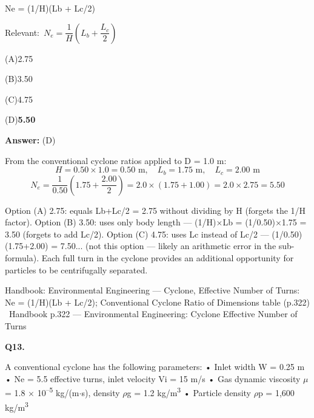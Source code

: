 \documentclass[11pt]{article}
\newcommand{\correct}[1]{\textbf{#1}\;{\color{accent}$\checkmark$}}
\newcommand{\optline}[2]{\par\noindent\hspace{1.2em}(#1)\hspace{0.6em}#2}
\begin{document}
Ne = (1/H)(Lb + Lc/2)\par\vspace{3pt}
{\small\color{soft}Relevant:}\ $N_e = \dfrac{1}{H}\left(L_b + \dfrac{L_c}{2}\right)$\par\vspace{3pt}
\optline{A}{2.75}
\optline{B}{3.50}
\optline{C}{4.75}
\optline{D}{\correct{5.50}}
\par\vspace{3pt}
\vspace{2pt}\par\noindent\colorbox{boxbg}{\parbox{\dimexpr\linewidth-2\fboxsep\relax}{%
\vspace{2pt}\textbf{Answer:} (D)\par\vspace{2pt}
{\small From the conventional cyclone ratios applied to D = 1.0 m:
\[H = 0.50\times1.0 = 0.50\text{ m},\quad L_b = 1.75\text{ m},\quad L_c = 2.00\text{ m}\]
\[N_e = \frac{1}{0.50}\left(1.75 + \frac{2.00}{2}\right) = 2.0\times(1.75+1.00) = 2.0\times2.75 = 5.50\]

Option (A) 2.75: equals Lb+Lc/2 = 2.75 without dividing by H (forgets the 1/H factor). Option (B) 3.50: uses only body length --- (1/H)$\times$Lb = (1/0.50)$\times$1.75 = 3.50 (forgets to add Lc/2). Option (C) 4.75: uses Lc instead of Lc/2 --- (1/0.50)(1.75+2.00) = 7.50... (not this option --- likely an arithmetic error in the sub-formula). Each full turn in the cyclone provides an additional opportunity for particles to be centrifugally separated.}\par\vspace{2pt}
{\footnotesize\color{soft}Handbook: Environmental Engineering --- Cyclone, Effective Number of Turns: Ne = (1/H)(Lb + Lc/2); Conventional Cyclone Ratio of Dimensions table (p.322) \textbullet\ Handbook p.322 --- Environmental Engineering: Cyclone Effective Number of Turns}\vspace{2pt}
}}
\vspace{9pt}
\filbreak
\textbf{\color{accent}Q13.}\par\vspace{2pt}
A conventional cyclone has the following parameters:
• Inlet width W = 0.25 m
• Ne = 5.5 effective turns, inlet velocity Vi = 15 m/s
• Gas dynamic viscosity $\mu$ = 1.8 $\times$ 10\textsuperscript{--}\textsuperscript{5} kg/(m$\cdot$s), density $\rho$g = 1.2 kg/m\textsuperscript{3}
• Particle density $\rho$p = 1,600 kg/m\textsuperscript{3}
\end{document}

